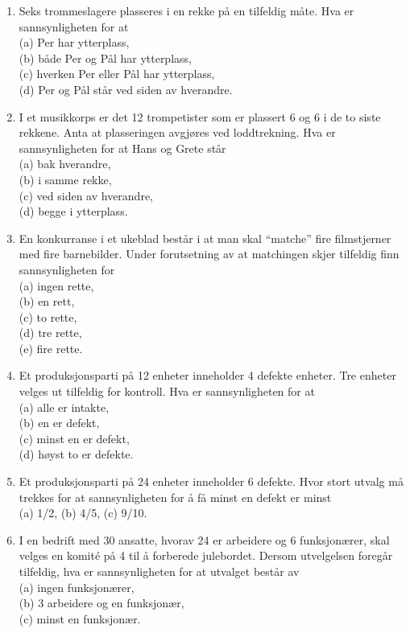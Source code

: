\begin{enumerate}
\item  Seks trommeslagere plasseres i en rekke på en tilfeldig
     måte. Hva er sannsynligheten for at\\
     (a)  Per har ytterplass,\\
     (b)  både Per og Pål har ytterplass,\\
     (c)  hverken Per eller Pål har ytterplass,\\
     (d)  Per og Pål står ved siden av hverandre.

\item  I et musikkorps er det 12 trompetister som er plassert 6 og
     6 i de to siste rekkene. Anta at plasseringen avgjøres ved
     loddtrekning. Hva er sannsynligheten for at Hans og Grete
     står\\
     (a)  bak hverandre,\\
     (b)  i samme rekke,\\
     (c)  ved siden av hverandre,\\
     (d)  begge i ytterplass.

\item  En konkurranse i et ukeblad består i at man skal ``matche''
     fire filmstjerner med fire barnebilder. Under forutsetning
     av at matchingen skjer tilfeldig finn sannsynligheten for\\
     (a)  ingen rette,\\
     (b)  en rett,\\
     (c)  to rette,\\
     (d)  tre rette,\\
     (e)  fire rette.

\item  Et produksjonsparti på 12 enheter inneholder 4 defekte
     enheter. Tre enheter velges ut tilfeldig for kontroll. Hva
     er sannsynligheten for at\\
     (a)  alle er intakte,\\
     (b)  en er defekt,\\
     (c)  minst en er defekt,\\
     (d)  høyst to er defekte.

\item  Et produksjonsparti på 24 enheter inneholder 6 defekte. Hvor
     stort utvalg må trekkes for at sannsynligheten for å få
     minst en defekt er minst\\
     (a)  1/2,  (b)  4/5,   (c)  9/10.\\

\item  I en bedrift med 30 ansatte, hvorav 24 er arbeidere og 6
     funksjonærer, skal velges en komit\'{e} på 4 til å forberede
     julebordet. Dersom utvelgelsen foregår tilfeldig, hva er
     sannsynligheten for at utvalget består av\\
     (a)  ingen funksjonærer,\\
     (b)  3 arbeidere og en funksjonær,\\
     (c)  minst en funksjonær.


\end{enumerate}
